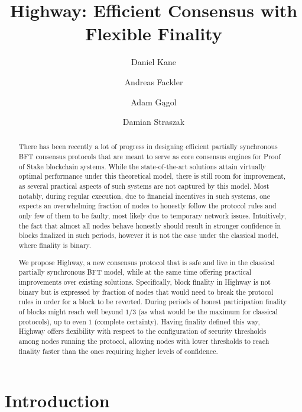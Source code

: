\documentclass[12pt, fleqn]{article}
\title{Highway: Efficient Consensus with Flexible Finality}
\author[1]{Daniel Kane}
\author[2]{Andreas Fackler}
\author[3]{Adam Gągol}
\author[4]{Damian Straszak}
\affil[1]{Computer Science and Engineering Department, UC San Diego}
\affil[2]{CasperLabs AG}
\affil[3,4]{Cardinal Cryptography}
\begin{document}
\maketitle

\begin{abstract}
There has been recently a lot of progress in designing efficient partially synchronous BFT consensus protocols that are meant to serve as core consensus engines for Proof of Stake blockchain systems.
% 
While the state-of-the-art solutions attain virtually optimal performance under this theoretical model, there is still room for improvement, as several practical aspects of such systems are not captured by this model.
%
Most notably, during regular execution, due to financial incentives in such systems, one expects an overwhelming fraction of nodes to honestly follow the protocol rules and only few of them to be faulty, most likely due to temporary network issues.
%
Intuitively, the fact that almost all nodes behave honestly should result in stronger confidence in blocks finalized in such periods, however it is not the case under the classical model, where finality is binary.
%

We propose Highway, a new consensus protocol that is safe and live in the classical partially synchronous BFT model, while at the same time offering practical improvements over existing solutions.
%
Specifically, block finality in Highway is not binary but is expressed by fraction of nodes that would need to break the protocol rules in order for a block to be reverted.
%
During periods of honest participation finality of blocks might reach well beyond $1/3$ (as what would be the maximum for classical protocols), up to even $1$ (complete certainty).
%
Having finality defined this way, Highway offers flexibility with respect to the configuration of security thresholds among nodes running the protocol, allowing nodes with lower thresholds to reach finality faster than the ones requiring higher levels of confidence.

\end{abstract}

\section{Introduction}
\end{document}
